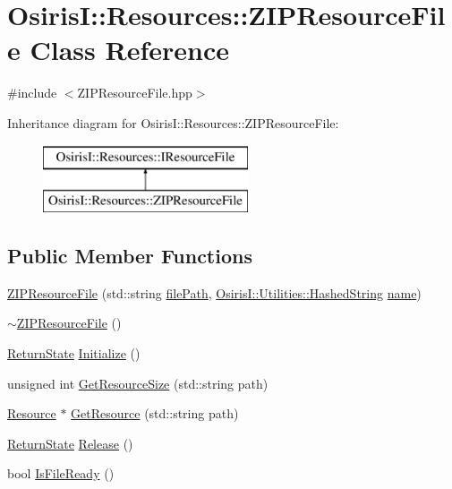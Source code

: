 \hypertarget{class_osiris_i_1_1_resources_1_1_z_i_p_resource_file}{\section{Osiris\-I\-:\-:Resources\-:\-:Z\-I\-P\-Resource\-File Class Reference}
\label{class_osiris_i_1_1_resources_1_1_z_i_p_resource_file}
}


{\ttfamily \#include $<$Z\-I\-P\-Resource\-File.\-hpp$>$}

Inheritance diagram for Osiris\-I\-:\-:Resources\-:\-:Z\-I\-P\-Resource\-File\-:\begin{figure}[H]
\begin{center}
\leavevmode
\includegraphics[height=2.000000cm]{class_osiris_i_1_1_resources_1_1_z_i_p_resource_file}
\end{center}
\end{figure}
\subsection*{Public Member Functions}
\begin{DoxyCompactItemize}
\item 
\hyperlink{class_osiris_i_1_1_resources_1_1_z_i_p_resource_file_acfe81160b07b6d10ce0fd11aea288253}{Z\-I\-P\-Resource\-File} (std\-::string \hyperlink{class_osiris_i_1_1_resources_1_1_i_resource_file_a81045e67b0d06a44955e4e562eea7c05}{file\-Path}, \hyperlink{class_osiris_i_1_1_utilities_1_1_hashed_string}{Osiris\-I\-::\-Utilities\-::\-Hashed\-String} \hyperlink{class_osiris_i_1_1_resources_1_1_i_resource_file_ac08fab4403efba9b63648e65c7cc7408}{name})
\item 
\hyperlink{class_osiris_i_1_1_resources_1_1_z_i_p_resource_file_aefe84521ccbe45a16e8280fbde2c4d8f}{$\sim$\-Z\-I\-P\-Resource\-File} ()
\item 
\hyperlink{namespace_osiris_i_a8f53bf938dc75c65c6a529694514013e}{Return\-State} \hyperlink{class_osiris_i_1_1_resources_1_1_z_i_p_resource_file_a900f7d43a1aa4ed1fb20737d389e9f93}{Initialize} ()
\item 
unsigned int \hyperlink{class_osiris_i_1_1_resources_1_1_z_i_p_resource_file_ab545d160f073e881b34d00424f17a7e4}{Get\-Resource\-Size} (std\-::string path)
\item 
\hyperlink{class_osiris_i_1_1_resources_1_1_resource}{Resource} $\ast$ \hyperlink{class_osiris_i_1_1_resources_1_1_z_i_p_resource_file_a68a0aed19cfbd1353ece37be85d65105}{Get\-Resource} (std\-::string path)
\item 
\hyperlink{namespace_osiris_i_a8f53bf938dc75c65c6a529694514013e}{Return\-State} \hyperlink{class_osiris_i_1_1_resources_1_1_z_i_p_resource_file_aae357e2ca5f80a927a2694f12cc829fd}{Release} ()
\item 
bool \hyperlink{class_osiris_i_1_1_resources_1_1_z_i_p_resource_file_af7c8b7d4af5980e93c7153e49d9bedfb}{Is\-File\-Ready} ()
\end{DoxyCompactItemize}
